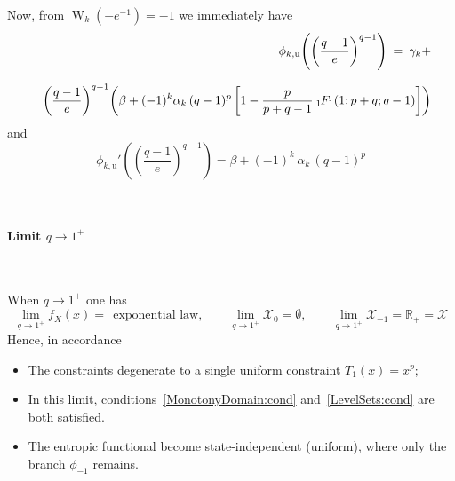 \documentclass[entropy,article,submit,moreauthors,pdftex]{Definitions/mdpi}
\def\Rset{\mathbb{R}}%
\def\X{\mathcal{X}}%
\def\W{\operatorname{W}} %
\newcommand{\hypgeom}[2]{\mbox{}_{#1}\hspace{-1pt}F_{#2}}%
\def\u{\mathrm{u}}
\begin{document}
\

Now, from $\W_k(-e^{-1}) = -1$ we immediately have
%
\begin{eqnarray}
%
&& \phi_{k,\u}\left( \left( \frac{q-1}{e} \right)^{q-1} \right) \: = \: \gamma_k
  + \nonumber
\\[2.5mm]
&& \left( \frac{q-1}{e} \right)^{q-1} \left( \beta + (-1)^k \alpha_k \, (q-1)^p
\, \left[ 1 - \frac{p}{p+q-1} \: \hypgeom{1}{1}\left( 1 ; p+q ; q-1 \right)
  \right] \right)
%
\end{eqnarray}
%
and
%
\begin{equation}
\phi_{k,\u}'\left( \left(  \frac{q-1}{e} \right)^{q-1} \right) =  \beta + (-1)^k
\, \alpha_k \, (q-1)^p
\end{equation}


\

\paragraph{\bf Limit $q \to 1^+$}

\

When $q \to 1^+$ one has
%
\[
\lim_{q \to 1^+}  f_X(x) = \:\: \mbox{exponential law}, \qquad  \lim_{q \to 1^+}
\X_0 = \emptyset, \qquad \lim_{q \to 1^+} \X_{-1} = \Rset_+ = \X
\]
%
Hence, in accordance
\begin{itemize}
\item The constraints degenerate to a single uniform constraint $T_1(x) = x^p$;
%
\item In this limit, conditions~\ref{MonotonyDomain:cond} and~\ref{LevelSets:cond}
    are both satisfied.
%
\item The entropic functional become state-independent (uniform), where only the
  branch $\phi_{-1}$ remains.  
%
\end{itemize}
\end{document}
